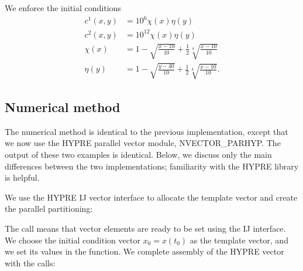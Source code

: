 \documentclass[letterpaper,10pt,english]{sphinxmanual}
\begin{document}
We enforce the initial conditions
\begin{equation*}
\begin{split}c^1(x,y) &=  10^6 \chi(x)\eta(y) \\
c^2(x,y) &=  10^{12} \chi(x)\eta(y) \\
\chi(x) &= 1 - \sqrt{\frac{x - 10}{10}} + \frac12 \sqrt[4]{\frac{x - 10}{10}} \\
\eta(y) &= 1 - \sqrt{\frac{y - 40}{10}} + \frac12 \sqrt[4]{\frac{x - 10}{10}}.\end{split}
\end{equation*}

\subsection{Numerical method}
\label{\detokenize{c_parhyp:numerical-method}}
The numerical method is identical to the previous implementation,
except that we now use the HYPRE parallel vector module,
NVECTOR\_PARHYP.  The output of these two examples is identical.
Below, we discuss only the main differences between the two
implementations; familiarity with the HYPRE library is helpful.

We use the HYPRE IJ vector interface to allocate the template vector
and create the parallel partitioning:

%
\begin{sphinxVerbatim}[commandchars=\\\{\}]
       
 
\end{sphinxVerbatim}

The  call means that vector elements are ready to be set using
the IJ interface. We choose the initial condition vector \(x_0 =
x(t_0)\) as the template vector, and we set its values in the
 function. We complete assembly of the
HYPRE vector with the calls:

%
\begin{sphinxVerbatim}[commandchars=\\\{\}]
  
\end{sphinxVerbatim}
\end{document}
